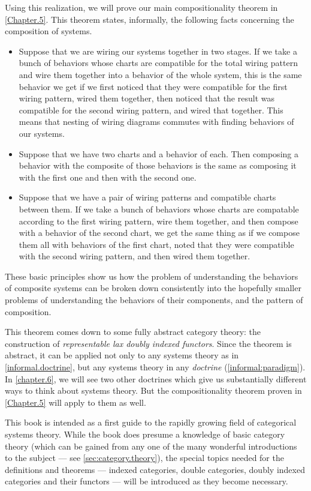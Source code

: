 \documentclass[DynamicalBook]{subfiles}
\begin{document}
Using this realization, we will prove our main compositionality theorem in \cref{Chapter.5}. This theorem states, informally, the following facts concerning the composition of systems.
\begin{itemize}
  \item Suppose that we are wiring
    our systems together in two stages. If we take a
    bunch of behaviors whose charts are compatible for the total wiring pattern
    and wire them together into a behavior of the whole system, this is the same
    behavior we get if we first noticed that they were compatible for the first
    wiring pattern, wired them together, then noticed that the result was
    compatible for the second wiring pattern, and wired that together. This
    means that nesting of wiring diagrams commutes with finding behaviors of our systems.
  \item Suppose that we have two
    charts and a behavior of each. Then composing a behavior with the composite of those behaviors is the same as composing
    it with the first one and then with the second one.
  \item Suppose that we have a pair of
    wiring patterns and compatible charts between them. If we
    take a bunch of behaviors whose charts are compatable according to the first
    wiring pattern, wire them together, and then compose with a behavior of the
    second chart, we get the same thing as if we compose them all with behaviors
    of the first chart, noted that they were compatible with the second wiring
    pattern, and then wired them together.
\end{itemize}

These basic principles show us how the problem of understanding the behaviors of composite systems can be broken down consistently into the hopefully smaller problems of understanding the behaviors of their components, and the pattern of composition.

This theorem comes down to some fully abstract category theory: the construction of \emph{representable lax doubly indexed functors}. Since the theorem is abstract, it can be applied not only to any systems theory as in \cref{informal.doctrine}, but any systems theory in any \emph{doctrine} (\cref{informal:paradigm}). In \cref{chapter.6}, we will see two other doctrines which give us substantially different ways to think about systems theory. But the compositionality theorem proven in \cref{Chapter.5} will apply to them as well.

This book is intended as a first guide to the rapidly growing field of categorical systems theory. While the book does presume a knowledge of basic category theory (which can be gained from any one of the many wonderful introductions to the subject --- see \cref{sec:category.theory}), the special topics needed for the definitions and theorems --- indexed categories, double categories, doubly indexed categories and their functors --- will be introduced as they become necessary.
\end{document}
